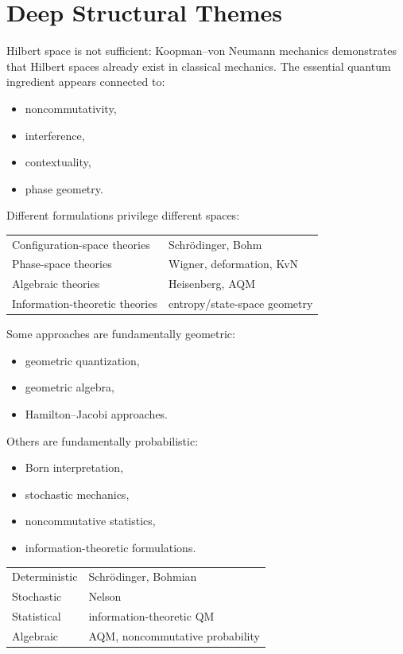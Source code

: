 \section{Deep Structural Themes}
Hilbert space is not sufficient:
Koopman--von Neumann mechanics demonstrates that Hilbert spaces already exist in classical mechanics.
The essential quantum ingredient appears connected to:
\begin{itemize}
\item noncommutativity,
\item interference,
\item contextuality,
\item phase geometry.
\end{itemize}
Different formulations privilege different spaces:
\begin{center}
\begin{tabular}{ll}
Configuration-space theories & Schr\"odinger, Bohm \\
Phase-space theories & Wigner, deformation, KvN \\
Algebraic theories & Heisenberg, AQM \\
Information-theoretic theories & entropy/state-space geometry
\end{tabular}
\end{center}
Some approaches are fundamentally geometric:
\begin{itemize}
\item geometric quantization,
\item geometric algebra,
\item Hamilton--Jacobi approaches.
\end{itemize}
Others are fundamentally probabilistic:
\begin{itemize}
\item Born interpretation,
\item stochastic mechanics,
\item noncommutative statistics,
\item information-theoretic formulations.
\end{itemize}
\begin{center}
\begin{tabular}{ll}
Deterministic & Schr\"odinger, Bohmian \\
Stochastic & Nelson \\
Statistical & information-theoretic QM \\
Algebraic & AQM, noncommutative probability
\end{tabular}
\end{center}

